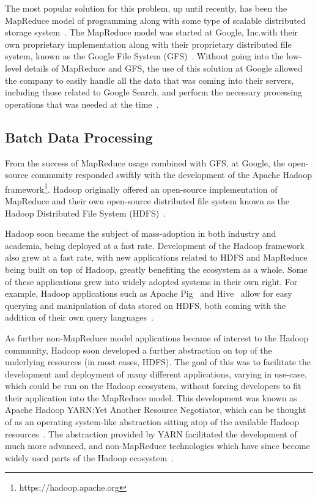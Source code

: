 The most popular solution for this problem, up until recently, has been the MapReduce %
 model of programming along with
some type of scalable distributed storage system~\cite{bifet_mining_2013}. The MapReduce model was started at Google,
Inc.\@ with their own proprietary implementation along with their proprietary distributed file system, known as the Google
File System (GFS)~\cite{ghemawat_google_2003}. Without going into the low-level details of MapReduce and GFS, the use of this solution at Google
allowed the company to easily handle all the data that was coming into their servers, including those related to Google Search, and perform the necessary
processing operations that was needed at the time~\cite{ghemawat_google_2003,dean_mapreduce:_2008}.


\subsection{Batch Data Processing} %
\label{sub:apache hadoop}

From the success of MapReduce usage combined with GFS, at Google, the open-source community responded swiftly with the
development of the Apache Hadoop framework\footnote{https://hadoop.apache.org}. Hadoop originally offered an open-source
implementation of MapReduce and their own open-source distributed file system known as the Hadoop Distributed File System
(HDFS)~\cite{shvachko_hadoop_2010}.

Hadoop soon became the subject of mass-adoption in both industry and academia, being deployed at a fast rate.
Development of the Hadoop framework also grew at a fast rate, with new applications related to HDFS and MapReduce being
built on top of Hadoop, greatly benefiting the ecosystem as a whole. Some of these applications grew into widely adopted
systems in their own right. For example, Hadoop applications such as Apache Pig~\cite{gates2009building} and
Hive~\cite{thusoo2010hive} allow for easy querying and manipulation of data stored on HDFS, both coming with the
addition of their own query languages~\cite{olston_pig_2008}.

As further non-MapReduce model applications became of interest to the Hadoop community, Hadoop soon
developed a further abstraction on top of the underlying resources (in most cases, HDFS). The goal of this was to
facilitate the development and deployment of many different applications, varying in use-case, which could be run on the
Hadoop ecosystem, without forcing developers to fit their application into the MapReduce model. This development was
known as Apache Hadoop YARN:\@ Yet Another Resource Negotiator, which can be thought of as an operating system-like abstraction sitting
atop of the available Hadoop resources~\cite{vavilapalli_apache_2013}. The abstraction provided by YARN facilitated the
development of much more advanced, and non-MapReduce technologies which have since become widely used parts of the
Hadoop ecosystem~\cite{harrison_hadoops_2012}.

